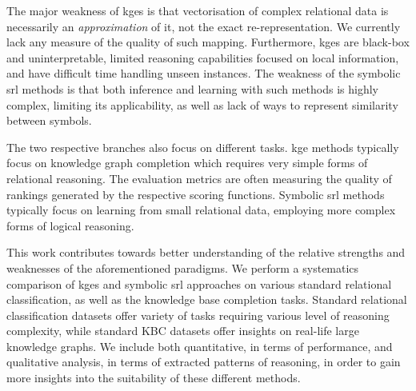 The major weakness of \gls{kge}s is that vectorisation of complex relational data is necessarily an \textit{approximation} of it, not the exact re-representation.
We currently lack any measure of the quality of such mapping.
Furthermore, \gls{kge}s are black-box and uninterpretable, limited reasoning capabilities focused on local information, and have difficult time handling unseen instances.
The weakness of the symbolic \gls{srl} methods is that both inference and learning with such methods is highly complex, limiting its applicability, as well as lack of ways to represent similarity between symbols.



The two respective branches also focus on different tasks.
\gls{kge} methods typically focus on knowledge graph completion which requires very simple forms of relational reasoning. The evaluation metrics are often measuring the quality of rankings generated by the respective scoring functions.
Symbolic \gls{srl} methods typically focus on learning from small relational data, employing more complex forms of logical reasoning.







This work contributes towards better understanding of the relative strengths and weaknesses of the aforementioned paradigms.
We perform a systematics comparison of \gls{kge}s and symbolic \gls{srl} approaches on various standard relational classification, as well as the knowledge base completion tasks.
Standard relational classification datasets offer variety of tasks requiring various level of reasoning complexity, while standard KBC datasets offer insights on real-life large knowledge graphs.
We include both quantitative, in terms of performance, and qualitative analysis, in terms of extracted patterns of reasoning, in order to gain more insights into the suitability of these different methods.









